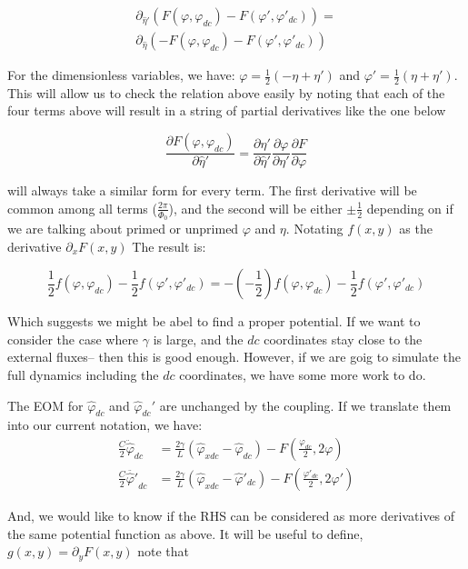 \documentclass[paper=a4, twocolumn, fontsize=10pt]{article} %
\numberwithin{equation}{section} %
\numberwithin{figure}{section} %
\numberwithin{table}{section} %
\def \df#1{\hat{#1}}
\def \dl#1{#1}
\begin{document}
\begin{align}
 \partial_{\df\eta'} \left( F(\dl\varphi, \dl\varphi_{dc}) - F(\dl\varphi', \dl\varphi'_{dc})\right) =  \\
 \partial_{\df\eta} \left( -F(\dl\varphi, \dl\varphi_{dc}) - F(\dl\varphi', \dl\varphi'_{dc})\right) 
 \end{align}


For the dimensionless variables,  we have: $\dl\varphi = \frac{1}{2} (-\dl\eta+\dl\eta')$ and $\dl\varphi' = \frac{1}{2} (\dl\eta+\dl\eta')$. This will allow us to check the relation above easily by noting that each of the four terms above will result in a string of partial derivatives like the one below

\[ \frac{\partial F(\dl\varphi,\dl\varphi_{dc})}{\partial \df\eta'}  =\frac{\partial \dl\eta'}{\partial \df\eta'} \frac{\partial \dl\varphi}{\partial \dl\eta'} \frac{\partial F}{\partial \dl\varphi} \]

will always take a similar form for every term. The first derivative will be common among all terms ($\frac{2\pi}{\Phi_0}$), and the second will be either $\pm \frac{1}{2}$ depending on if we are talking about primed or unprimed $\dl\varphi$ and $\dl\eta$. Notating $f(x,y)$ as the derivative $\partial_x F(x,y)$ The result is:

\[ \frac{1}{2} f(\dl\varphi, \dl\varphi_{dc}) - \frac{1}{2} f(\dl\varphi', \dl\varphi'_{dc}) = - \left(-\frac{1}{2}\right) f(\dl\varphi, \dl\varphi_{dc}) - \frac{1}{2} f(\dl\varphi', \dl\varphi'_{dc})\]

Which suggests we might be abel to find a proper potential. If we want to consider the case where $\gamma$ is large, and the $dc$ coordinates stay close to the external fluxes-- then this is good enough. However, if we are goig to simulate the full dynamics including the $dc$ coordinates, we have some more work to do.

The EOM for $\df\varphi_{dc}$ and $\df\varphi_{dc}'$ are unchanged by the coupling. If we translate them into our current notation, we have:
\begin{align}
\frac{C}{2} \ddot{\df\varphi}_{dc} &= \frac{2\gamma}{L}\left( \df\varphi_{xdc} -\df\varphi_{dc}\right) -  F(\frac{\dl\varphi_{dc}}{2}, 2\dl\varphi) \\
\frac{C}{2} \ddot{\df\varphi'}_{dc} &= \frac{2\gamma}{L}\left( \df\varphi_{xdc} -\df\varphi'_{dc}\right) -  F(\frac{\dl\varphi'_{dc}}{2}, 2\dl\varphi')
\end{align}

And, we would like to know if the RHS can be considered as more derivatives of the same potential function as above. It will be useful to define, $g(x,y) = \partial_{y} F(x,y)$ note that
\end{document}
